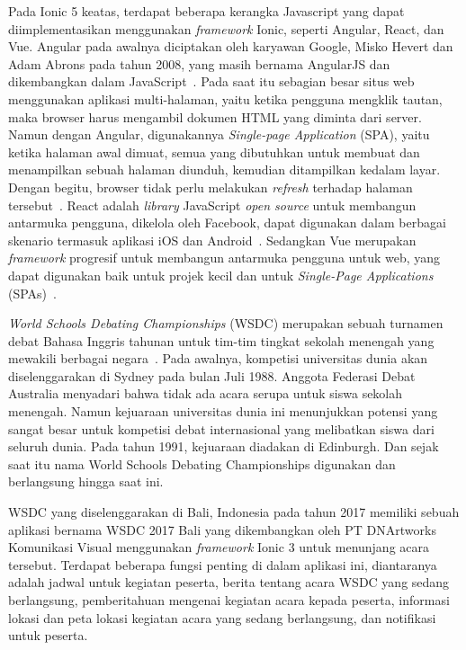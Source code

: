 Pada Ionic 5 keatas, terdapat beberapa kerangka Javascript yang dapat diimplementasikan menggunakan \textit{framework} Ionic, seperti Angular, React, dan Vue. Angular pada awalnya diciptakan oleh karyawan Google, Misko Hevert dan Adam Abrons pada tahun 2008, yang masih bernama AngularJS dan dikembangkan dalam JavaScript~\cite{wohlgethan:18:supporting}. Pada saat itu sebagian besar situs web menggunakan aplikasi multi-halaman, yaitu ketika pengguna mengklik tautan, maka browser harus mengambil dokumen HTML yang diminta dari server. Namun dengan Angular, digunakannya \textit{Single-page Application} (SPA), yaitu ketika halaman awal dimuat, semua yang dibutuhkan untuk membuat dan menampilkan sebuah halaman diunduh, kemudian ditampilkan kedalam layar. Dengan begitu, browser tidak perlu melakukan \textit{refresh} terhadap halaman tersebut~\cite{scott:15:spa}. React adalah \textit{library} JavaScript {\it open source} untuk membangun antarmuka pengguna, dikelola oleh Facebook, dapat digunakan dalam berbagai skenario termasuk aplikasi iOS dan Android~\cite{wohlgethan:18:supporting}. Sedangkan Vue merupakan \textit{framework}  progresif untuk membangun antarmuka pengguna untuk web, yang dapat digunakan baik untuk projek kecil dan untuk {\it Single-Page Applications} (SPAs)~\cite{wohlgethan:18:supporting}.

\textit{World Schools Debating Championships} (WSDC) merupakan sebuah turnamen debat Bahasa Inggris tahunan untuk tim-tim tingkat sekolah menengah yang mewakili berbagai negara~\cite{wsdc}. Pada awalnya, kompetisi universitas dunia akan diselenggarakan di Sydney pada bulan Juli 1988. Anggota Federasi Debat Australia menyadari bahwa tidak ada acara serupa untuk siswa sekolah menengah. Namun kejuaraan universitas dunia ini menunjukkan potensi yang sangat besar untuk kompetisi debat internasional yang melibatkan siswa dari seluruh dunia. Pada tahun 1991, kejuaraan diadakan di Edinburgh. Dan sejak saat itu nama World Schools Debating Championships digunakan dan berlangsung hingga saat ini. 

WSDC yang diselenggarakan di Bali, Indonesia pada tahun 2017 memiliki sebuah aplikasi bernama WSDC 2017 Bali yang dikembangkan oleh PT DNArtworks Komunikasi Visual menggunakan \textit{framework} Ionic 3 untuk menunjang acara tersebut. Terdapat beberapa fungsi penting di dalam aplikasi ini, diantaranya adalah jadwal untuk kegiatan peserta, berita tentang acara WSDC yang sedang berlangsung, pemberitahuan mengenai kegiatan acara kepada peserta, informasi lokasi dan peta lokasi kegiatan acara yang sedang berlangsung, dan notifikasi untuk peserta. 

